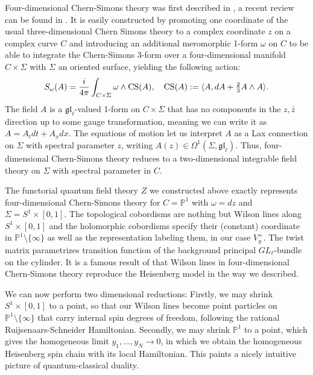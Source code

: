 \documentclass[11pt]{report}
\theoremstyle{definition}
\theoremstyle{remark}
\theoremstyle{remark}
\renewcommand{\P}{\mathbb{P}}
\begin{document}
Four-dimensional Chern-Simons theory was first described in \cite{article:costello:2013}, a recent review can be found in \cite{article:lacroix:2022}. It is easily constructed by promoting one coordinate of the usual three-dimensional Chern Simons theory to a complex coordinate $z$ on a complex curve $C$ and introducing an additional meromorphic 1-form $\omega$ on $C$ to be able to integrate the Chern-Simons 3-form over a four-dimensional manifold $C \times \Sigma$ with $\Sigma$ an oriented surface, yielding the following action:
\begin{equation*}
S_\omega(A) = \frac{i}{4\pi} \int_{C \times \Sigma} \omega \wedge \textnormal{CS}(A), \quad \textnormal{CS}(A) := \langle A, dA + \tfrac 23 A \wedge A \rangle.
\end{equation*}
The field $A$ is a $\mathfrak{gl}_\ell$-valued 1-form on $C \times \Sigma$ that has no components in the $z,\bar z$ direction up to some gauge transformation, meaning we can write it as $A = A_t dt + A_x dx$. The equations of motion let us interpret $A$ as a Lax connection on $\Sigma$ with spectral parameter $z$, writing $A(z) \in \Omega^1(\Sigma,\mathfrak{gl}_\ell)$. Thus, four-dimensional Chern-Simons theory reduces to a two-dimensional integrable field theory on $\Sigma$ with spectral parameter in $C$.

The functorial quantum field theory $Z$ we constructed above exactly represents four-dimen\-sional Chern-Simons theory for $C=\P^1$ with $\omega = dz$ and $\Sigma = S^1 \times [0,1]$. The topological cobordisms are nothing but Wilson lines along $S^1 \times [0,1]$ and the holomorphic cobordisms specify their (constant) coordinate in $\P^1 \setminus \{ \infty \}$ as well as the representation labeling them, in our case $V_y^+$. The twist matrix parametrizes transition function of the background principal $GL_\ell$-bundle on the cylinder. It is a famous result of \cite{article:costello:2013} that Wilson lines in four-dimensional Chern-Simons theory reproduce the Heisenberg model in the way we described.

We can now perform two dimensional reductions: Firstly, we may shrink $S^1 \times [0,1]$ to a point, so that our Wilson lines become point particles on $\P^1 \setminus \{ \infty \}$ that carry internal spin degrees of freedom, following the rational Ruijsenaars-Schneider Hamiltonian. Secondly, we may shrink $\P^1$ to a point, which gives the homogeneous limit $y_1,...,y_N \to 0$, in which we obtain the homogeneous Heisenberg spin chain with its local Hamiltonian. This paints a nicely intuitive picture of quantum-classical duality.
\end{document}
